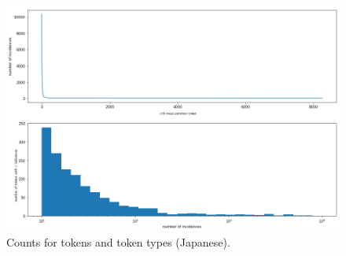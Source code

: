 \documentclass[answers]{exam}
\begin{document}
\begin{CJK}{UTF8}{min}
\begin{figure}
  \centering
  \includegraphics[width=\linewidth]{fig-toks-fr}
  \caption{Counts for tokens and token types (Japanese).}
  \label{fig:toks-fr}
\end{figure}

\end{CJK}
\end{document}
